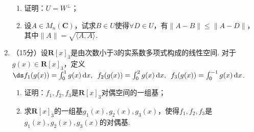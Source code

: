 \begin{enumerate}
\begin{enumerate}
        \item 证明：$U=W^{\perp}$；

        \item 设$A\in M_n(\mathbf{C})$，试求$B\in U$使得$\forall D\in U$，有$\lVert A-B \rVert\leqslant\lVert A-D \rVert$，其中$\lVert A \rVert=\sqrt{\langle A,A\rangle}$.
    \end{enumerate}

	\item （15分）设$\mathbf{R}[x]_3$是由次数小于3的实系数多项式构成的线性空间. 对于$g(x)\in\mathbf{R}[x]_3$，定义$\ds f_1(g(x))=\int_0^1g(x)\,\mathrm{d}x,\enspace f_2(g(x))=\int_0^2g(x)\,\mathrm{d}x,\enspace f_3(g(x))=\int_0^{-1}g(x)\,\mathrm{d}x$.
    \begin{enumerate}
        \item 证明：$f_1,f_2,f_3$是$\mathbf{R}[x]_3$对偶空间的一组基；

        \item 求$\mathbf{R}[x]_3$的一组基$g_1(x),g_2(x),g_3(x)$，使得$f_1,f_2,f_3$是$g_1(x),g_2(x),g_3(x)$的对偶基.
    \end{enumerate}
\end{enumerate}

\clearpage
